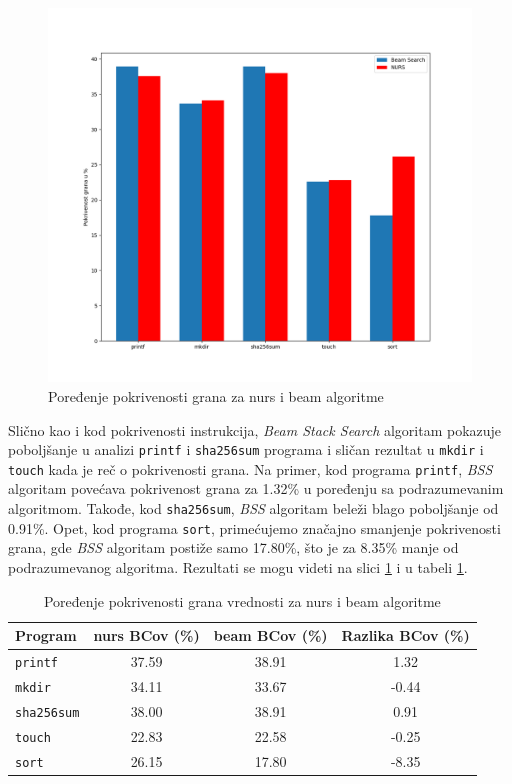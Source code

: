 \documentclass[a4paper]{article}
\begin{document}
\begin{figure}[h!]
    \centering
    \includegraphics[width=\linewidth]{ilustracije/BCov.png}
    \caption{Poređenje pokrivenosti grana za nurs i beam algoritme}
    \label{fig:bcov_comparison}
\end{figure}

Slično kao i kod pokrivenosti instrukcija, \textit{Beam Stack Search} algoritam pokazuje poboljšanje u analizi \verb|printf| i \verb|sha256sum| programa i sličan rezultat u \verb|mkdir| i \verb|touch| kada je reč o pokrivenosti grana. Na primer, kod programa \verb|printf|, \textit{BSS} algoritam povećava pokrivenost grana za 1.32\% u poređenju sa podrazumevanim algoritmom. Takođe, kod \verb|sha256sum|, \textit{BSS} algoritam beleži blago poboljšanje od 0.91\%. Opet, kod programa \verb|sort|, primećujemo značajno smanjenje pokrivenosti grana, gde \textit{BSS} algoritam postiže samo 17.80\%, što je za 8.35\% manje od podrazumevanog algoritma. Rezultati se mogu videti na slici \ref{fig:bcov_comparison} i u tabeli \ref{tab:bcov_comparison}.

\begin{table}[h!]
\centering
\begin{tabular}{|l|c|c|c|}
\hline
\textbf{Program} & \textbf{nurs BCov (\%)} & \textbf{beam BCov (\%)} & \textbf{Razlika BCov (\%)} \\ \hline
\texttt{printf} & 37.59 & 38.91 & 1.32 \\ \hline
\texttt{mkdir} & 34.11 & 33.67 & -0.44 \\ \hline
\texttt{sha256sum} & 38.00 & 38.91 & 0.91 \\ \hline
\texttt{touch} & 22.83 & 22.58 & -0.25 \\ \hline
\texttt{sort} & 26.15 & 17.80 & -8.35 \\ \hline
\end{tabular}
\caption{Poređenje pokrivenosti grana vrednosti za nurs i beam algoritme}
\label{tab:bcov_comparison}
\end{table}
\end{document}
